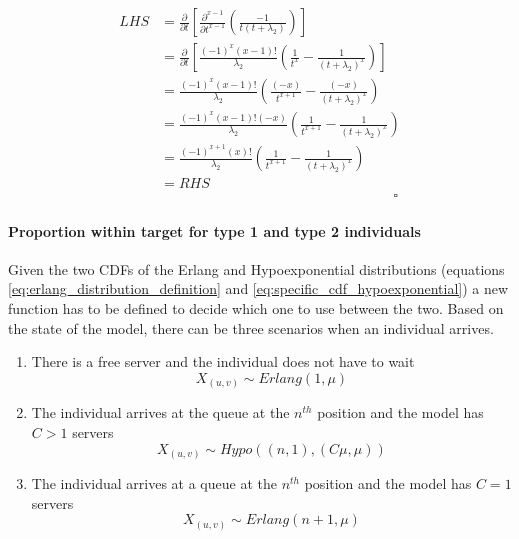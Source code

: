 \begin{itemize}
\begin{enumerate}
        \begin{equation*}
            \begin{split}
                LHS &= \frac{\partial}{\partial t}
                \left[ \frac{\partial^{x-1}}{\partial t ^ {x-1}}
                \left( \frac{-1}{t (t + \lambda_2)} \right) \right] \\
                &= \frac{\partial}{\partial t} \left[
                    \frac{(-1)^x (x-1)!}{\lambda_2} \left(
                        \frac{1}{t^x} - \frac{1}{(t + \lambda_2)^x}
                    \right)
                \right] \\
                &= \frac{(-1)^x (x-1)!}{\lambda_2} \left(
                    \frac{(-x)}{t^{x+1}} - \frac{(-x)}{(t + \lambda_2)^x}
                \right) \\
                &= \frac{(-1)^x (x-1)! (-x)}{\lambda_2} \left(
                    \frac{1}{t^{x+1}} - \frac{1}{(t + \lambda_2)^x}
                \right) \\
                &= \frac{(-1)^{x+1} (x)!}{\lambda_2} \left(
                    \frac{1}{t^{x+1}} - \frac{1}{(t + \lambda_2)^x}
                \right) \\
                & = RHS \\
                & \hspace{7cm} \square
            \end{split}
        \end{equation*}
    \end{enumerate}
\end{itemize}

\paragraph{Proportion within target for type 1 and type 2 individuals}

Given the two CDFs of the Erlang and Hypoexponential distributions (equations
\ref{eq:erlang_distribution_definition} and
\ref{eq:specific_cdf_hypoexponential}) a new function has to be defined to
decide which one to use between the two.
Based on the state of the model, there can be three scenarios when an individual
arrives.
\begin{enumerate}
    \item There is a free server and the individual does not have to wait
    \begin{equation*}
        X_{(u,v)} \sim Erlang(1, \mu)
    \end{equation*}
    \item The individual arrives at the queue at the \(n^{th}\) position and the
    model has \(C > 1\) servers
    \begin{equation*}
        X_{(u,v)} \sim Hypo((n, 1), (C \mu, \mu))
    \end{equation*}
    \item The individual arrives at a queue at the \(n^{th}\) position and the
    model has \(C = 1\) servers
    \begin{equation*}
        X_{(u,v)} \sim Erlang(n + 1, \mu)
    \end{equation*}
\end{enumerate}


